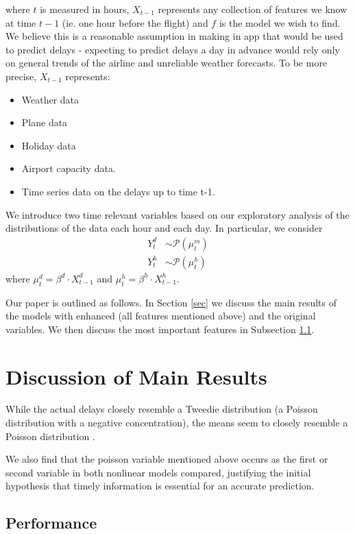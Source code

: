 \documentclass[twocolumn,showpacs,%
  nofootinbib,aps,superscriptaddress,%
  eqsecnum,prd,notitlepage,showkeys,10pt]{revtex4-1}
\begin{document}
where $t$ is measured in hours, $X_{t-1}$ represents any collection of features we know at time $t-1$ (ie. one hour before the flight) and $f$ is the model we wish to find. 
We believe this is a reasonable assumption in making
in app that would be used to predict delays - expecting to predict delays a day in advance would rely only on general trends of the airline and unreliable weather forecasts. To be more precise, $X_{t-1}$ represents:
\begin{itemize}
\item Weather data
\item Plane data
\item Holiday data
\item Airport capacity data.
\item Time series data on the delays up to time t-1. 
\end{itemize}
We introduce two time relevant variables based on our exploratory analysis of the distributions of the data each hour and each day. In particular, we consider 
\begin{align} Y_t^{d} &\sim \mathcal{P}(\mu_t^m)\\
Y_t^{h} &\sim \mathcal{P}(\mu_t^h)
\end{align}
where $\mu_t^d = \beta^d \cdot X_{t-1}^d$ and $\mu_t^h= \beta^h \cdot X_{t-1}^h$.

Our paper is outlined as follows. In Section \ref{sec} we discuss the main results of the models with enhanced (all features mentioned above)  and the original variables. We then discuss
the most important features in Subsection \ref{}.

\section{Discussion of Main Results}
\label{sec:examples}
While the actual delays closely resemble a Tweedie distribution \cite{} (a Poisson distribution with a negative concentration), the means seem to closely resemble a Poisson distribution \cite{}.


We also find that the poisson variable mentioned above occurs as the first or second variable in both nonlinear models compared, justifying the initial hypothesis that timely information 
is essential for an accurate prediction. 



\subsection{Performance}
\end{document}
